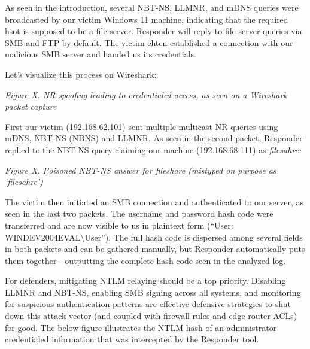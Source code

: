 As seen in the introduction, several NBT-NS, LLMNR, and mDNS queries were broadcasted by our victim Windows 11 machine, indicating that the required hsot is supposed to be a file server. Responder will reply to file server queries via SMB and FTP by default. The victim ehten established a connection with our malicious SMB server and handed us its credentials.

Let’s visualize this process on Wireshark:

\textit{Figure X. NR spoofing leading to credentialed access, as seen on a Wireshark packet capture}

First our victim (192.168.62.101) sent multiple multicast NR queries using mDNS, NBT-NS (NBNS) and LLMNR. As seen in the second packet, Responder replied to the NBT-NS query claiming our machine (192.168.68.111) as \textit{filesahre:}

\textit{Figure X. Poisoned NBT-NS answer for fileshare (mistyped on purpose as ‘filesahre’)}

The victim then initiated an SMB connection and authenticated to our server, as seen in the last two packets. The username and password hash code were transferred and are now visible to us in plaintext form (“User: WINDEV2004EVAL\textbackslash{}User”). The full hash code is dispersed among several fields in both packets and can be gathered manually, but Responder automatically puts them together - outputting the complete hash code seen in the analyzed log.


For defenders, mitigating NTLM relaying should be a top priority. Disabling LLMNR and NBT-NS, enabling SMB signing across all systems, and monitoring for suspicious authentication patterns are effective defensive strategies to shut down this attack vector (and coupled with firewall rules and edge router ACLs) for good. The below figure illustrates the NTLM hash of an administrator credentialed information that was intercepted by the Responder tool.

 
